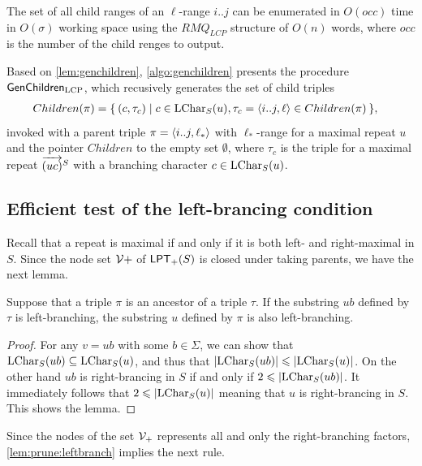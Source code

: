 \documentclass{article}
\begin{document}
\begin{lemma}\label{lem:genchildren}
  The set of all child ranges of an $\ell$-range $i..j$ can be enumerated in $O(occ)$ time in $O(\sigma)$ working space
  using the $RMQ_{LCP}$ structure of $O(n)$ words, 
where $occ$ is the number of the child renges to output.  
\end{lemma}

Based on \cref{lem:genchildren}, \cref{algo:genchildren} presents the procedure $\GenChildren$, which recusively generates the set of child triples
\begin{align}
  Children(\pi)
  &= \sete{ (c, \tau_c) \mid c \in \LChar(u), \tau_c = \pair{i..j, \ell} \in Children(\pi)}, 
\end{align}
invoked with a parent triple $\pi = \pair{i..j, \ell_*}$ with $\ell_*$-range for a maximal repeat $u$ and the pointer $Children$ to the empty set $\emptyset$,
where $\tau_c$ is the triple for a maximal repeat $\rext{(uc)}$ with a branching character $c \in \LChar(u)$.

\subsection{Efficient test of the left-brancing condition}

Recall that a repeat is maximal if and only if it is both left- and right-maximal in $S$. Since the node set $\sig V+$ of $\LPT[+](S)$ is closed under taking parents, we have the next lemma.

\begin{lemma}\label{lem:prune:leftbranch}
Suppose that a triple $\pi$ is an ancestor of a triple $\tau$. If the substring $ub$ defined by $\tau$ is left-branching, the substring $u$ defined by $\pi$ is also left-branching. 
\end{lemma}

\begin{proof}
  For any $v = ub$ with some $b \in \Sigma$, we can show that
  $\LChar(ub) \subseteq \LChar(u)$, and thus that $|\LChar(ub)| \le |\LChar(u)|$. On the other hand $ub$ is right-brancing in $S$ if and only if $2\le |\LChar(ub)|$. It immediately follows that $2 \le |\LChar(u)|$ meaning that $u$ is right-brancing in $S$. This shows the lemma. 
\end{proof}


Since the nodes of the set $\sig V_+$ represents all and only the right-branching factors, \cref{lem:prune:leftbranch} implies the next rule.
\end{document}
